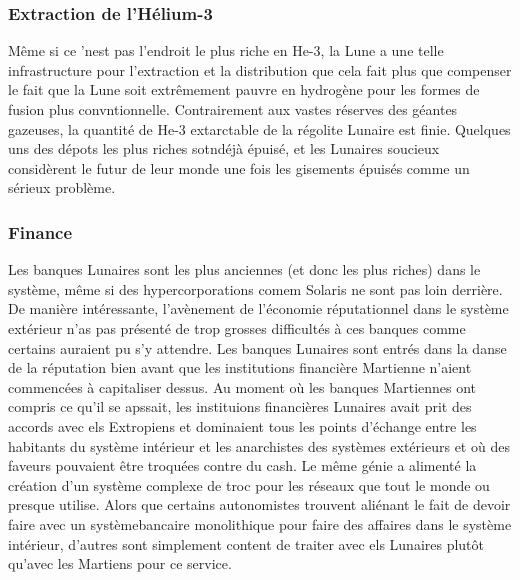                                                             \subsubsection{Extraction de l'Hélium-3} \label{sec:helium-3-mining} 

                                                            Même si ce 'nest pas l'endroit le plus riche en He-3, la Lune a une telle infrastructure pour l'extraction et la distribution que cela fait plus que compenser le fait que la Lune soit extrêmement pauvre en hydrogène pour les formes de fusion plus convntionnelle. Contrairement aux vastes réserves des géantes gazeuses, la quantité de He-3 extarctable de la régolite Lunaire est finie. Quelques uns des dépots les plus riches sotndéjà épuisé, et les Lunaires soucieux considèrent le futur de leur monde une fois les gisements épuisés comme un sérieux problème. 

                                                            \subsubsection{Finance} \label{sec:finance} 

                                                            Les banques Lunaires sont les plus anciennes (et donc les plus riches) dans le système, même si des hypercorporations comem Solaris ne sont pas loin derrière. De manière intéressante, l'avènement de l'économie réputationnel dans le système extérieur n'as pas présenté de trop grosses difficultés à ces banques comme certains auraient pu s'y attendre. Les banques Lunaires sont entrés dans la danse de la réputation bien avant que les institutions financière Martienne n'aient commencées à capitaliser dessus. Au moment où les banques Martiennes ont compris ce qu'il se apssait, les instituions financières Lunaires avait prit des accords avec els Extropiens et dominaient tous les points d'échange entre les habitants du système intérieur et les anarchistes des systèmes extérieurs et où des faveurs pouvaient être troquées contre du cash. Le même génie a alimenté la création d'un système complexe de troc pour les réseaux que tout le monde ou presque utilise. Alors que certains autonomistes trouvent aliénant le fait de devoir faire avec un systèmebancaire monolithique pour faire des affaires dans le système intérieur, d'autres sont simplement content de traiter avec els Lunaires plutôt qu'avec les Martiens pour ce service. 

